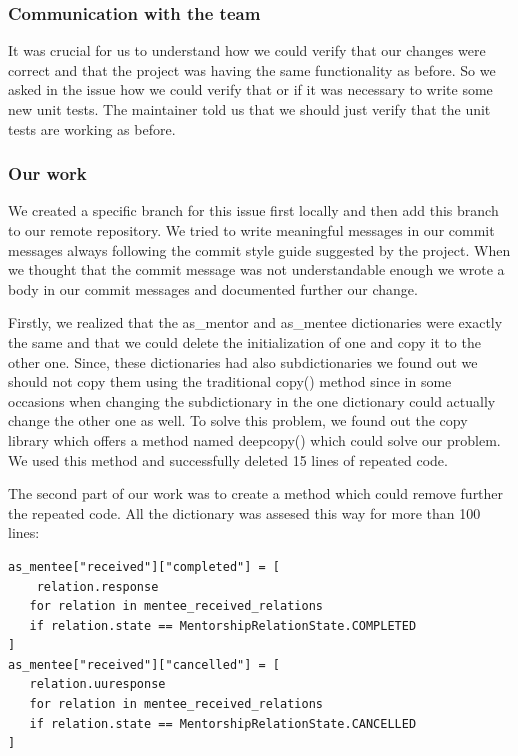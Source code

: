 \documentclass{article}
\begin{document}
\subsubsection{Communication with the team}
\hspace{0.5cm}It was crucial for us to understand how we could verify that our changes were correct and that the project was having the same functionality as before. So we asked in the issue how we could verify that or if it was necessary to write some new unit tests. The maintainer told us that we should just verify that the unit tests are working as before.

\subsubsection{Our work}
\hspace{0.5cm}We created a specific branch for this issue first locally and then add this branch to our remote repository. We tried to write meaningful messages in our commit messages always following the commit style guide suggested by the project. When we thought that the commit message was not understandable enough we wrote a body in our commit messages and documented further our change.

Firstly, we realized that the as\_mentor and as\_mentee dictionaries were exactly the same and that we could delete the initialization of one and copy it to the other one. Since, these dictionaries had also subdictionaries we found out we should not copy them using the traditional copy() method since in some occasions when changing the subdictionary in the one dictionary could actually change the other one as well. To solve this problem, we found out the copy library which offers a method named deepcopy() which could solve our problem. We used this method and successfully deleted 15 lines of repeated code.

The second part of our work was to create a method which could remove further the repeated code. All the dictionary was assesed this way for more than 100 lines:
\lstset{language=Python}
\begin{lstlisting}
as_mentee["received"]["completed"] = [
    relation.response
   for relation in mentee_received_relations
   if relation.state == MentorshipRelationState.COMPLETED
]
as_mentee["received"]["cancelled"] = [
   relation.uuresponse
   for relation in mentee_received_relations
   if relation.state == MentorshipRelationState.CANCELLED
]
\end{lstlisting}
\end{document}
